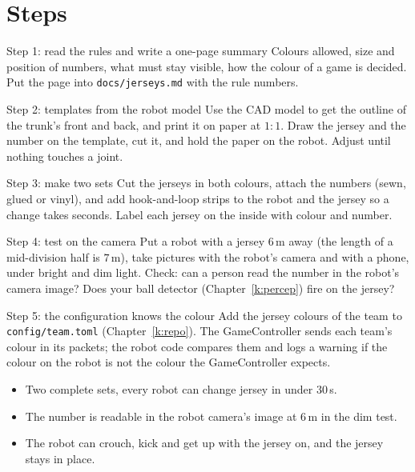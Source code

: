 \section*{Steps}
\begin{stepbox}{Step 1: read the rules and write a one-page summary}
Colours allowed, size and position of numbers, what must stay visible, how the colour of a game is decided. Put the page into \texttt{docs/jerseys.md} with the rule numbers.
\end{stepbox}

\begin{stepbox}{Step 2: templates from the robot model}
Use the CAD model to get the outline of the trunk's front and back, and print it on paper at $1:1$. Draw the jersey and the number on the template, cut it, and hold the paper on the robot. Adjust until nothing touches a joint.
\end{stepbox}

\begin{stepbox}{Step 3: make two sets}
Cut the jerseys in both colours, attach the numbers (sewn, glued or vinyl), and add hook-and-loop strips to the robot and the jersey so a change takes seconds. Label each jersey on the inside with colour and number.
\end{stepbox}

\begin{stepbox}{Step 4: test on the camera}
Put a robot with a jersey $6$\,m away (the length of a mid-division half is $7$\,m), take pictures with the robot's camera\guess{} and with a phone, under bright and dim light. Check: can a person read the number in the robot's camera image? Does your ball detector (Chapter~\ref{k:percep}) fire on the jersey?
\end{stepbox}

\begin{stepbox}{Step 5: the configuration knows the colour}
Add the jersey colours of the team to \texttt{config/team.toml} (Chapter~\ref{k:repo}). The GameController sends each team's colour in its packets; the robot code compares them and logs a warning if the colour on the robot is not the colour the GameController expects.
\end{stepbox}

\begin{checkbox}
\begin{itemize}[nosep]
  \item Two complete sets, every robot can change jersey in under $30$\,s.
  \item The number is readable in the robot camera's image at $6$\,m in the dim test.
  \item The robot can crouch, kick and get up with the jersey on, and the jersey stays in place.
\end{itemize}
\end{checkbox}

